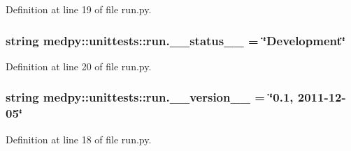 Definition at line 19 of file run.py.

\hypertarget{namespacemedpy_1_1unittests_1_1run_aa658cc188118864725cfcbe1d02842d9}{
\subsubsection[{\_\-\_\-status\_\-\_\-}]{\setlength{\rightskip}{0pt plus 5cm}string {\bf medpy::unittests::run.\_\-\_\-status\_\-\_\-} = \char`\"{}Development\char`\"{}}}
\label{namespacemedpy_1_1unittests_1_1run_aa658cc188118864725cfcbe1d02842d9}


Definition at line 20 of file run.py.

\hypertarget{namespacemedpy_1_1unittests_1_1run_ae5bd4829ce2f2cc968d0df81f16c945e}{
\subsubsection[{\_\-\_\-version\_\-\_\-}]{\setlength{\rightskip}{0pt plus 5cm}string {\bf medpy::unittests::run.\_\-\_\-version\_\-\_\-} = \char`\"{}0.1, 2011-\/12-\/05\char`\"{}}}
\label{namespacemedpy_1_1unittests_1_1run_ae5bd4829ce2f2cc968d0df81f16c945e}


Definition at line 18 of file run.py.

